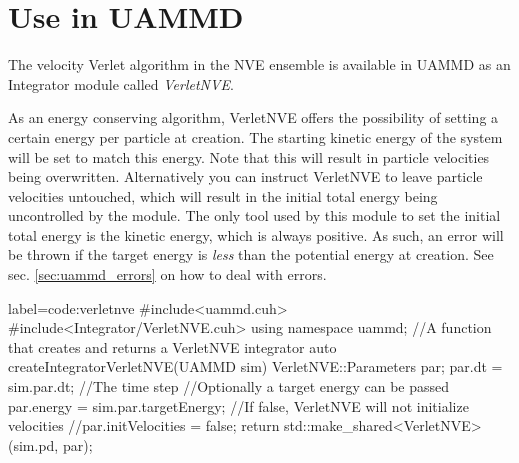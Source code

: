 \documentclass[ twoside,openright,titlepage,numbers=noenddot,%
headinclude,footinclude,cleardoublepage=empty,abstract=on,
BCOR=5mm,paper=a4,fontsize=11pt, dvipsnames
]{scrreprt}
\newcommand{\uammd}{\gls{UAMMD}\xspace}
\begin{document}
\section*{Use in UAMMD}
The velocity Verlet algorithm in the NVE ensemble is available in \uammd as an Integrator module called \emph{VerletNVE}.

As an energy conserving algorithm, VerletNVE offers the possibility of setting a certain energy per particle at creation.
The starting kinetic energy of the system will be set to match this energy. Note that this will result in particle velocities being overwritten.
Alternatively you can instruct VerletNVE to leave particle velocities untouched, which will result in the initial total energy being uncontrolled by the module.
The only tool used by this module to set the initial total energy is the kinetic energy, which is always positive. As such, an error will be thrown if the target energy is \emph{less} than the potential energy at creation. See sec. \ref{sec:uammd_errors} on how to deal with errors.

\begin{code2}{label=code:verletnve}
#include<uammd.cuh>
#include<Integrator/VerletNVE.cuh>
using namespace uammd;
//A function that creates and returns a VerletNVE integrator
auto createIntegratorVerletNVE(UAMMD sim){
  VerletNVE::Parameters par;
  par.dt = sim.par.dt; //The time step
  //Optionally a target energy can be passed
  par.energy = sim.par.targetEnergy;
  //If false, VerletNVE will not initialize velocities
  //par.initVelocities = false;
  return std::make_shared<VerletNVE>(sim.pd, par);
}
\end{code2}
\end{document}
